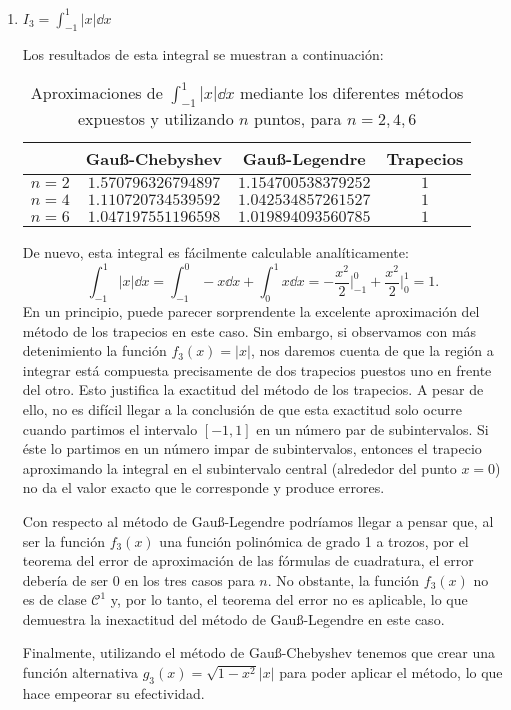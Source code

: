 \documentclass[a4paper]{article}
\begin{document}
\begin{enumerate}
    \item $\displaystyle I_3=\int_{-1}^1|x|\dd x$\par
    Los resultados de esta integral se muestran a continuación:
    \begin{table}[ht]
        \centering
        \captionsetup{width=0.9\textwidth}
        \begin{tabular}{|c|c|c|c|}
            \cline{2-4}
            \multicolumn{1}{c|}{} & Gau\ss-Chebyshev & Gau\ss-Legendre & Trapecios \\
            \hline
            $n=2$ & $1.570796326794897$ & $1.154700538379252$ & $1$ \\
            \hline
            $n=4$ & $1.110720734539592$ & $1.042534857261527$ & $1$ \\
            \hline
            $n=6$ & $1.047197551196598$ & $1.019894093560785$ & $1$ \\
            \hline
        \end{tabular}
        \caption{Aproximaciones de $\displaystyle\int_{-1}^1|x|\dd x$ mediante los diferentes métodos expuestos y utilizando $n$ puntos, para $n=2,4,6$}
    \end{table}\par
    De nuevo, esta integral es fácilmente calculable analíticamente: $$\int_{-1}^1|x|\dd x=\int_{-1}^0-x\dd x+\int_0^1x\dd x=-\frac{x^2}{2}\Bigg|_{-1}^0+\frac{x^2}{2}\Bigg|_0^1=1.$$
    En un principio, puede parecer sorprendente la excelente aproximación del método de los trapecios en este caso. Sin embargo, si observamos con más detenimiento la función $f_3(x)=|x|$, nos daremos cuenta de que la región a integrar está compuesta precisamente de dos trapecios puestos uno en frente del otro. Esto justifica la exactitud del método de los trapecios. A pesar de ello, no es difícil llegar a la conclusión de que esta exactitud solo ocurre cuando partimos el intervalo $[-1,1]$ en un número par de subintervalos. Si éste lo partimos en un número impar de subintervalos, entonces el trapecio aproximando la integral en el subintervalo central (alrededor del punto $x=0$) no da el valor exacto que le corresponde y produce errores.\par
    Con respecto al método de Gau\ss-Legendre podríamos llegar a pensar que, al ser la función $f_3(x)$ una función  polinómica de grado 1 a trozos, por el teorema del error de aproximación de las fórmulas de cuadratura, el error debería de ser 0 en los tres casos para $n$. No obstante, la función $f_3(x)$ no es de clase $\mathcal{C}^1$ y, por lo tanto, el teorema del error no es aplicable, lo que demuestra la inexactitud del método de Gau\ss-Legendre en este caso.\par
    Finalmente, utilizando el método de Gau\ss-Chebyshev tenemos que crear una función alternativa $g_3(x)=\sqrt{1-x^2}|x|$ para poder aplicar el método, lo que hace empeorar su efectividad.
\end{enumerate}
\end{document}
